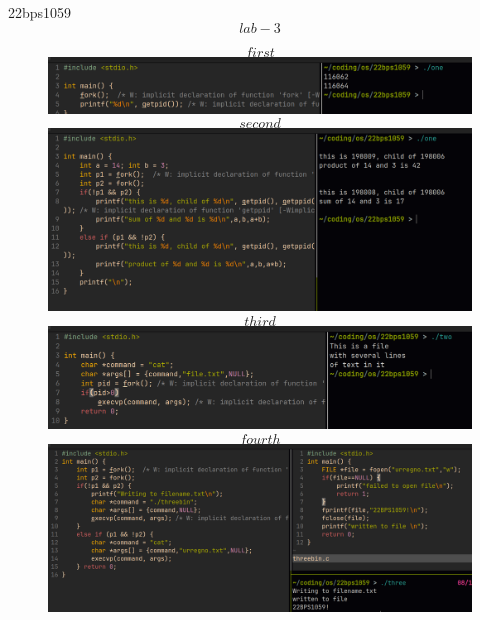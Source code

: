 \documentclass{article}
\begin{document}
\centering
{\LARGE 22bps1059}
$$lab-3$$
\begin{figure}[htbp]
  \centering
    $$first$$
  \includegraphics[width=1\linewidth]{fig1.png}
    $$second$$
  \includegraphics[width=1\linewidth]{fig2.png}
    $$third$$
  \includegraphics[width=1\linewidth]{fig3.png}
    $$fourth$$
  \includegraphics[width=1\linewidth]{fig4.png}
\end{figure}
\end{document}
